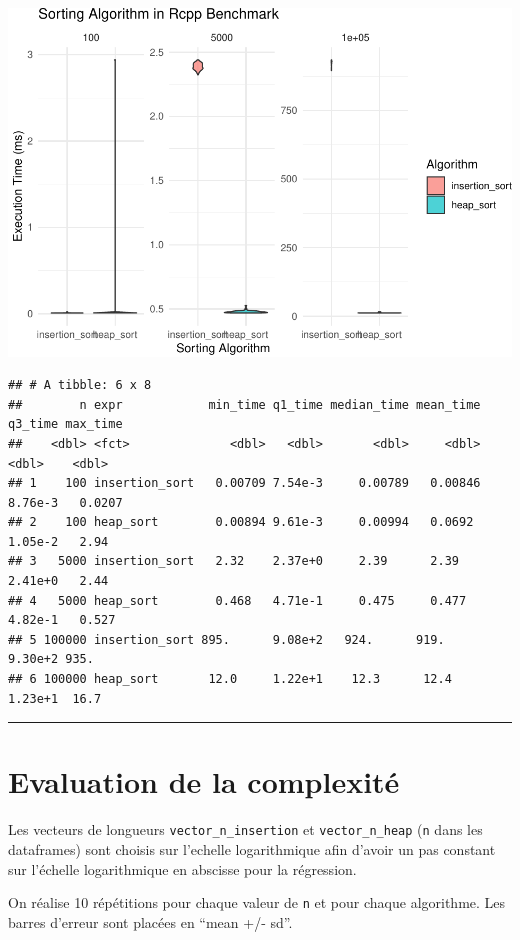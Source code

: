 \documentclass[
]{article}
\begin{document}
\includegraphics{1_Sorting_analyse_files/figure-latex/benchmark-1.pdf}

\begin{verbatim}
## # A tibble: 6 x 8
##        n expr            min_time q1_time median_time mean_time q3_time max_time
##    <dbl> <fct>              <dbl>   <dbl>       <dbl>     <dbl>   <dbl>    <dbl>
## 1    100 insertion_sort   0.00709 7.54e-3     0.00789   0.00846 8.76e-3   0.0207
## 2    100 heap_sort        0.00894 9.61e-3     0.00994   0.0692  1.05e-2   2.94  
## 3   5000 insertion_sort   2.32    2.37e+0     2.39      2.39    2.41e+0   2.44  
## 4   5000 heap_sort        0.468   4.71e-1     0.475     0.477   4.82e-1   0.527 
## 5 100000 insertion_sort 895.      9.08e+2   924.      919.      9.30e+2 935.    
## 6 100000 heap_sort       12.0     1.22e+1    12.3      12.4     1.23e+1  16.7
\end{verbatim}

\begin{center}\rule{0.5\linewidth}{0.5pt}\end{center}

\section{Evaluation de la
complexité}\label{evaluation-de-la-complexituxe9}

Les vecteurs de longueurs \texttt{vector\_n\_insertion} et
\texttt{vector\_n\_heap} (\texttt{n} dans les dataframes) sont choisis
sur l'echelle logarithmique afin d'avoir un pas constant sur l'échelle
logarithmique en abscisse pour la régression.

On réalise 10 répétitions pour chaque valeur de \texttt{n} et pour
chaque algorithme. Les barres d'erreur sont placées en ``mean +/- sd''.
\end{document}
